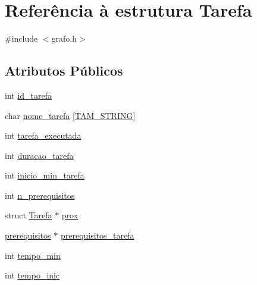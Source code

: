 \hypertarget{structTarefa}{\section{Referência à estrutura Tarefa}
\label{structTarefa}
}


{\ttfamily \#include $<$grafo.\-h$>$}

\subsection*{Atributos Públicos}
\begin{DoxyCompactItemize}
\item 
int \hyperlink{structTarefa_a1509b75b75f758e2d0502df4162366f2}{id\-\_\-tarefa}
\item 
char \hyperlink{structTarefa_a43c0db59f4e6a3031ef2a5951ad8910f}{nome\-\_\-tarefa} \mbox{[}\hyperlink{grafo_8h_a5d28dfdab86222715d699097e8cd092f}{T\-A\-M\-\_\-\-S\-T\-R\-I\-N\-G}\mbox{]}
\item 
int \hyperlink{structTarefa_a86ef331b855e3f91eec492a00171cc9c}{tarefa\-\_\-executada}
\item 
int \hyperlink{structTarefa_a7962bef326f487f4ffa7dc0f04153729}{duracao\-\_\-tarefa}
\item 
int \hyperlink{structTarefa_a7d09c30d0162c55a0aab1ad71716fae6}{inicio\-\_\-min\-\_\-tarefa}
\item 
int \hyperlink{structTarefa_a9f6369cef91f4b9d544d9e1be0bc705f}{n\-\_\-prerequisitos}
\item 
struct \hyperlink{structTarefa}{Tarefa} $\ast$ \hyperlink{structTarefa_a1b0bbf147698174596c486d12afa254e}{prox}
\item 
\hyperlink{grafo_8h_a8d260ebf15bfe9b5f9366d2245289e15}{prerequisitos} $\ast$ \hyperlink{structTarefa_abdbaac144f089e939832a4d6cbf0759a}{prerequisitos\-\_\-tarefa}
\item 
int \hyperlink{structTarefa_a4fd1b4c3fd98a3fb754116f6cc80c906}{tempo\-\_\-min}
\item 
int \hyperlink{structTarefa_a202a3c8fbee0bf74488fa057587f13df}{tempo\-\_\-inic}
\end{DoxyCompactItemize}


